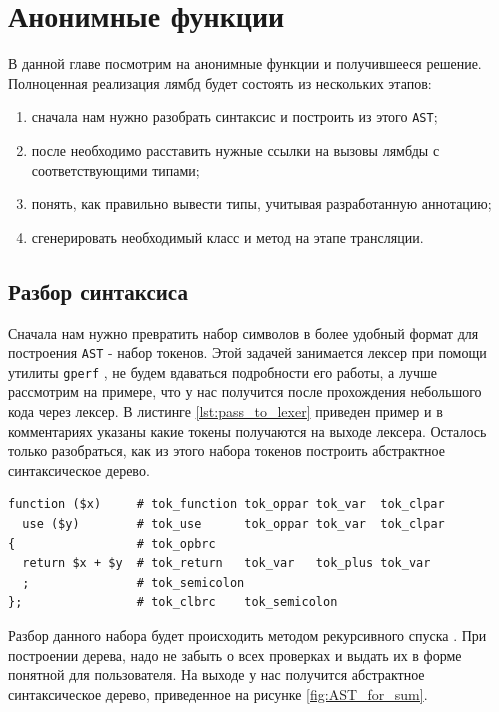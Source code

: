 \section{Анонимные функции}
В данной главе посмотрим на анонимные функции и получившееся решение.
Полноценная реализация лямбд будет состоять из нескольких этапов:
\begin{enumerate}
  \item сначала нам нужно разобрать синтаксис и построить из этого \verb|AST|;
  \item после необходимо расставить нужные ссылки на вызовы лямбды с соответствующими типами;
  \item понять, как правильно вывести типы, учитывая разработанную аннотацию;
  \item сгенерировать необходимый класс и метод на этапе трансляции.
\end{enumerate}

\subsection{Разбор синтаксиса}
Сначала нам нужно превратить набор символов в более удобный формат для построения \verb|AST| - набор токенов.
Этой задачей занимается лексер при помощи утилиты \verb|gperf| \cite[с.~461]{cpp_gems_gperf}, не будем вдаваться подробности его работы, а лучше рассмотрим на примере, что у нас получится после прохождения небольшого кода через лексер.
В листинге \ref{lst:pass_to_lexer} приведен пример и в комментариях указаны какие токены получаются на выходе лексера.
Осталось только разобраться, как из этого набора токенов построить абстрактное синтаксическое дерево.
\begin{lstlisting}[caption={Результат работы лексера},label={lst:pass_to_lexer}]
function ($x)     # tok_function tok_oppar tok_var  tok_clpar
  use ($y)        # tok_use      tok_oppar tok_var  tok_clpar
{                 # tok_opbrc
  return $x + $y  # tok_return   tok_var   tok_plus tok_var
  ;               # tok_semicolon
};                # tok_clbrc    tok_semicolon
\end{lstlisting}

Разбор данного набора будет происходить методом рекурсивного спуска \cite{recursive_descent_parser}.
При построении дерева, надо не забыть о всех проверках и выдать их в форме понятной для пользователя.
На выходе у нас получится абстрактное синтаксическое дерево, приведенное на рисунке \ref{fig:AST_for_sum}.

